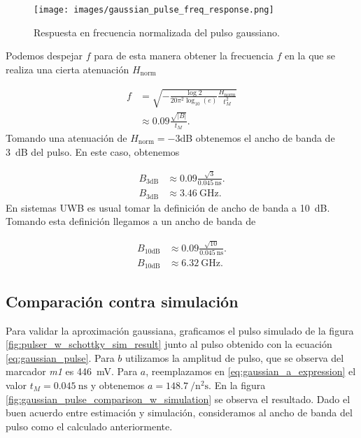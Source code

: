 \begin{figure}[t!]
    \centering
    \texttt{[image: images/gaussian\_pulse\_freq\_response.png]}
    \caption{Respuesta en frecuencia normalizada del pulso gaussiano.}
    \label{fig:gaussian_pulse_freq_response}
\end{figure}

Podemos despejar $f$ para de esta manera obtener la frecuencia $f$ en la que se
realiza una cierta atenuación $H_{\text{norm}}$

\begin{align}
    f &= \sqrt{-\frac{\log 2 }{20 \pi^2 \log_{10}(e)} \frac{H_{\text{norm}}}{t_M^2}} \\
    &\approx 0.09 \frac{\sqrt{|B|}}{t_M}.
\end{align}
Tomando una atenuación de $H_{\text{norm}}=-3$dB obtenemos el ancho de banda de
\qty{3}{\dB} del pulso. En este caso, obtenemos

\begin{equation}
    \begin{aligned}
        B_{\text{3dB}} &\approx 0.09 \frac{\sqrt{3}}{\qty{0.045}{\nano\second}}.  \\
        B_{\text{3dB}} &\approx \qty{3.46}{\giga\hertz}.
    \end{aligned}
\end{equation}
En sistemas UWB es usual tomar la definición de ancho de banda a \qty{10}{\dB}.
Tomando esta definición llegamos a un ancho de banda de

\begin{equation}
    \begin{aligned}
        B_{\text{10dB}} &\approx 0.09 \frac{\sqrt{10}}{\qty{0.045}{\nano\second}}.  \\
        B_{\text{10dB}} &\approx \qty{6.32}{\giga\hertz}.
    \end{aligned}
\end{equation}

\subsection{Comparación contra simulación}

Para validar la aproximación gaussiana, graficamos el pulso simulado de la
figura \ref{fig:pulser_w_schottky_sim_result} junto al pulso obtenido con la
ecuación \ref{eq:gaussian_pulse}. Para $b$ utilizamos la amplitud de pulso, que
se observa del marcador \textit{m1} es \qty{446}{\milli\volt}. Para $a$,
reemplazamos en \ref{eq:gaussian_a_expression} el valor
$t_M=\qty{0.045}{\nano\second}$ y obtenemos $a=
\qty{148.7}{\per\square\nano\second}$. En la figura
\ref{fig:gaussian_pulse_comparison_w_simulation} se observa el resultado. Dado
el buen acuerdo entre estimación y simulación, consideramos al ancho de banda
del pulso como el calculado anteriormente.

